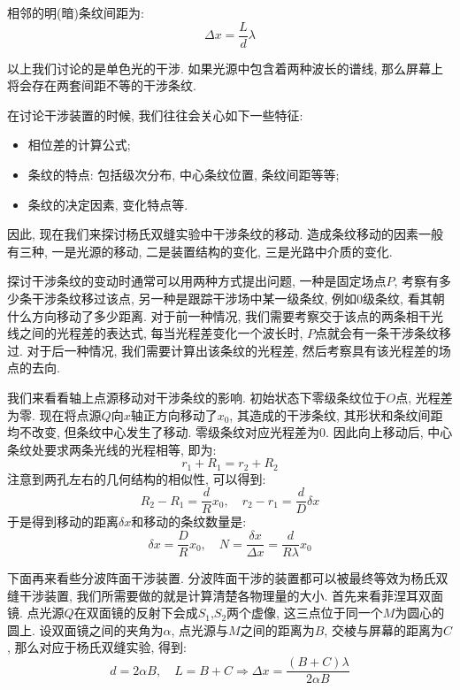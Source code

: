 相邻的明(暗)条纹间距为:
\[
\Delta x = \frac{L}{d}\lambda
\]

以上我们讨论的是单色光的干涉. 如果光源中包含着两种波长的谱线, 那么屏幕上将会存在两套间距不等的干涉条纹.

在讨论干涉装置的时候, 我们往往会关心如下一些特征:
\begin{itemize}
    \item 相位差的计算公式;
    \item 条纹的特点: 包括级次分布, 中心条纹位置, 条纹间距等等;
    \item 条纹的决定因素, 变化特点等.
\end{itemize}

因此, 现在我们来探讨杨氏双缝实验中干涉条纹的移动. 造成条纹移动的因素一般有三种, 一是光源的移动, 二是装置结构的变化, 三是光路中介质的变化.

探讨干涉条纹的变动时通常可以用两种方式提出问题, 一种是固定场点$P$, 考察有多少条干涉条纹移过该点, 另一种是跟踪干涉场中某一级条纹, 例如0级条纹, 看其朝什么方向移动了多少距离. 对于前一种情况, 我们需要考察交于该点的两条相干光线之间的光程差的表达式, 每当光程差变化一个波长时, $P$点就会有一条干涉条纹移过. 对于后一种情况, 我们需要计算出该条纹的光程差, 然后考察具有该光程差的场点的去向.

\begin{noteenv}
    我们来看看轴上点源移动对干涉条纹的影响. 初始状态下零级条纹位于$O$点, 光程差为零. 现在将点源$Q$向$x$轴正方向移动了$x_0$, 其造成的干涉条纹, 其形状和条纹间距均不改变, 但条纹中心发生了移动. 零级条纹对应光程差为$0$. 因此向上移动后, 中心条纹处要求两条光线的光程相等, 即为:
    \[
    r_1 + R_1 = r_2 + R_2
    \]
    注意到两孔左右的几何结构的相似性, 可以得到:
    \[
    R_2 - R_1 = \frac{d}{R}x_0 , \quad r_2 - r_1 = \frac{d}{D}\delta x
    \]
    于是得到移动的距离$\delta x$和移动的条纹数量是:
    \[
    \delta x = \frac{D}{R}x_0, \quad N = \frac{\delta x}{\Delta x} = \frac{d}{R\lambda}x_0
    \]
\end{noteenv}

下面再来看些分波阵面干涉装置. 分波阵面干涉的装置都可以被最终等效为杨氏双缝干涉装置, 我们所需要做的就是计算清楚各物理量的大小. 首先来看菲涅耳双面镜. 点光源$Q$在双面镜的反射下会成$S_1$,$S_2$两个虚像, 这三点位于同一个$M$为圆心的圆上. 设双面镜之间的夹角为$\alpha$, 点光源与$M$之间的距离为$B$, 交棱与屏幕的距离为$C$, 那么对应于杨氏双缝实验, 得到:
\[
d = 2\alpha B, \quad L =B+C \Rightarrow \Delta x = \frac{(B+C)\lambda}{2\alpha B}
\]


